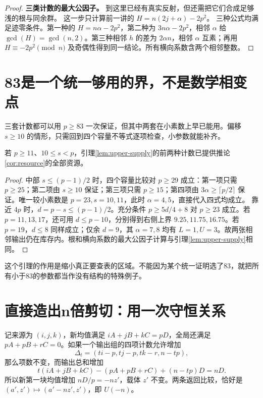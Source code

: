 \begin{proof}
\par\noindent\textbf{三类计数的最大公因子。}
到这里已经有真实反射，但还需把它们合成足够浅的根与同余群。
这一步只计算前一讲的 $H=n(2j+\alpha)-2p^2$。
三种公式均满足迹零条件。第一种的 $H=n\alpha-2p^2$，第二种为 $3n\alpha-2p^2$，相邻 $\alpha$ 给 $\gcd(H)=\gcd(n,2)$。第三种相邻 $h$ 的差为 $2\alpha n$，相邻 $\alpha$ 互素；再用 $H\equiv-2p^2\pmod n$ 及奇偶性得到同一结论。所有横向系数含两个相邻整数。
\end{proof}

\section{83是一个统一够用的界，不是数学相变点}
三套计数都可以用 $p\ge83$ 一次保证，但其中两套在小素数上早已能用。偏移 $s\ge10$ 的情形，只需回到四个容量不等式逐项检查，小参数就能补齐。
\begin{lemma}\label{lem:upper-small}
若 $p\ge11$、$10\le s<p$，引理\ref{lem:upper-supply}的前两种计数已提供推论\ref{cor:resource}的全部资源。
\end{lemma}
\begin{proof}
中部 $s\le(p-1)/2$ 时，四个容量比较对 $p\ge29$ 成立：第一项只需 $p\ge25$；第二项由 $s\ge10$ 保证；第三项只需 $p\ge15$；第四项由 $3\alpha\ge\lceil p/2\rceil$ 保证。唯一较小素数是 $p=23,s=10,11$，此时 $\alpha=4,5$，直接代入四式均成立。
靠近 $4p$ 时，$d=p-s\le(p-1)/2$。充分条件 $p\ge5d/4+8$ 对 $p\ge23$ 成立。若 $p=11,13,17$，还可用 $d\le p-10$，分别得到右侧上界 $9.25,11.75,16.75$。若 $p=19$，$d\le8$ 同样成立；仅余 $d=9$，其 $\alpha=7,8$ 均有 $L=1,U=3$。故两张相邻输出仍在库存内。根和横向系数的最大公因子计算与引理\ref{lem:upper-supply}相同。
\end{proof}
这个引理的作用是缩小真正要查表的区域。不能因为某个统一证明选了83，就把所有小于83的参数都当作没有结构的特殊例子。

\section{直接造出n倍剪切：用一次守恒关系}
记来源为 $(i,j,k)$，新均值满足 $iA+jB+kC=pD$，全局还满足 $pA+pB+rC=0$。如果一个输出组的四项计数允许增加
\[\Delta_t=(ti-p, tj-p, tk-r, n-tp),
\]
那么项数不变，而输出总和增加
\[
t(iA+jB+kC)-(pA+pB+rC)+(n-tp)D=nD.
\]
所以新第一块均值增加 $nD/p=-nz'$，载体 $z'$ 不变。两条返回比较，恰好是 $(a',z')\mapsto(a'-nz',z')$，即 $U(-n)$。

